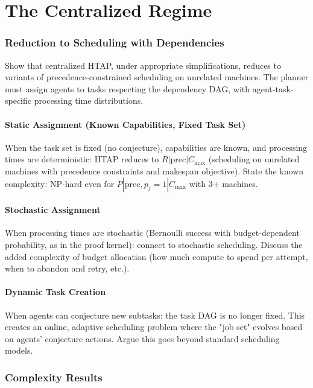 \chapter{The Centralized Regime}\label{chap:centralized}

\subsection{Reduction to Scheduling with Dependencies}
Show that centralized HTAP, under appropriate simplifications, reduces to variants of precedence-constrained scheduling on unrelated machines. The planner must assign agents to tasks respecting the dependency DAG, with agent-task-specific processing time distributions.

\subsubsection{Static Assignment (Known Capabilities, Fixed Task Set)}
When the task set is fixed (no conjecture), capabilities are known, and processing times are deterministic: HTAP reduces to $R | \text{prec} | C_{\max}$ (scheduling on unrelated machines with precedence constraints and makespan objective). State the known complexity: NP-hard even for $P | \text{prec}, p_j = 1 | C_{\max}$ with 3+ machines.

\subsubsection{Stochastic Assignment}
When processing times are stochastic (Bernoulli success with budget-dependent probability, as in the proof kernel): connect to stochastic scheduling. Discuss the added complexity of budget allocation (how much compute to spend per attempt, when to abandon and retry, etc.).

\subsubsection{Dynamic Task Creation}
When agents can conjecture new subtasks: the task DAG is no longer fixed. This creates an online, adaptive scheduling problem where the "job set" evolves based on agents' conjecture actions. Argue this goes beyond standard scheduling models.

\subsection{Complexity Results}

